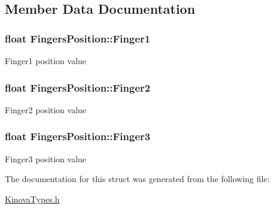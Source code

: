 \subsection{Member Data Documentation}
\hypertarget{struct_fingers_position_a216f8d64e6a9c7aab84e4269ccb27e66}{
\subsubsection[{Finger1}]{\setlength{\rightskip}{0pt plus 5cm}float Fingers\-Position\-::\-Finger1}}\label{struct_fingers_position_a216f8d64e6a9c7aab84e4269ccb27e66}
Finger1 position value \hypertarget{struct_fingers_position_a0ec9675672721d61fb13bbc2db3d3ef9}{
\subsubsection[{Finger2}]{\setlength{\rightskip}{0pt plus 5cm}float Fingers\-Position\-::\-Finger2}}\label{struct_fingers_position_a0ec9675672721d61fb13bbc2db3d3ef9}
Finger2 position value \hypertarget{struct_fingers_position_a03c819e4c20367e36e62a864bf829160}{
\subsubsection[{Finger3}]{\setlength{\rightskip}{0pt plus 5cm}float Fingers\-Position\-::\-Finger3}}\label{struct_fingers_position_a03c819e4c20367e36e62a864bf829160}
Finger3 position value 

The documentation for this struct was generated from the following file\-:\begin{DoxyCompactItemize}
\item 
\hyperlink{_kinova_types_8h}{Kinova\-Types.\-h}\end{DoxyCompactItemize}
